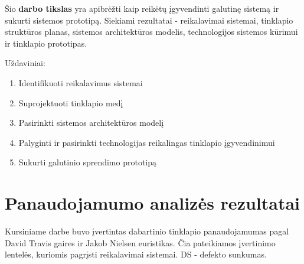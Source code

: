 \documentclass{VUMIFPSkursinis}
\begin{document}
Šio \textbf{darbo tikslas} yra apibrėžti kaip reikėtų įgyvendinti galutinę sistemą ir sukurti sistemos prototipą. Siekiami rezultatai - reikalavimai sistemai, tinklapio struktūros planas, sistemos architektūros modelis, technologijos sistemos kūrimui ir tinklapio prototipas.

Uždaviniai:
\begin{enumerate}
	\item Identifikuoti reikalavimus sistemai
	\item Suprojektuoti tinklapio medį
	\item Pasirinkti sistemos architektūros modelį
	\item Palyginti ir pasirinkti technologijas reikalingas tinklapio įgyvendinimui
	\item Sukurti galutinio sprendimo prototipą
\end{enumerate}

\section{Panaudojamumo analizės rezultatai}
Kursiniame darbe buvo įvertintas dabartinio tinklapio panaudojamumas pagal David Travis gaires ir Jakob Nielsen euristikas\cite{Kursinis}. Čia pateikiamos įvertinimo lentelės, kuriomis pagrįsti reikalavimai sistemai. DS - defekto sunkumas.
\end{document}
